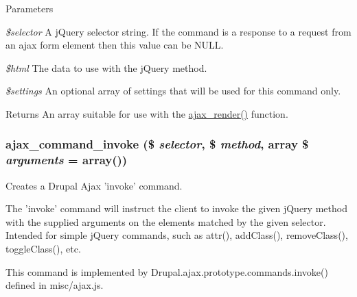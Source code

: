 \begin{DoxyParams}{Parameters}
\item[{\em \$selector}]A jQuery selector string. If the command is a response to a request from an ajax form element then this value can be NULL. \item[{\em \$html}]The data to use with the jQuery method. \item[{\em \$settings}]An optional array of settings that will be used for this command only.\end{DoxyParams}
\begin{DoxyReturn}{Returns}
An array suitable for use with the \hyperlink{group__ajax_ga241c2426bdde049c55b05b7bf5d714a2}{ajax\_\-render()} function. 
\end{DoxyReturn}
\hypertarget{group__ajax__commands_gac49706a740d78d75f6a55bd2dba21c80}{
\subsubsection[{ajax\_\-command\_\-invoke}]{\setlength{\rightskip}{0pt plus 5cm}ajax\_\-command\_\-invoke (\$ {\em selector}, \/  \$ {\em method}, \/  array \$ {\em arguments} = {\ttfamily array()})}}
\label{group__ajax__commands_gac49706a740d78d75f6a55bd2dba21c80}
Creates a Drupal Ajax 'invoke' command.

The 'invoke' command will instruct the client to invoke the given jQuery method with the supplied arguments on the elements matched by the given selector. Intended for simple jQuery commands, such as attr(), addClass(), removeClass(), toggleClass(), etc.

This command is implemented by Drupal.ajax.prototype.commands.invoke() defined in misc/ajax.js.


